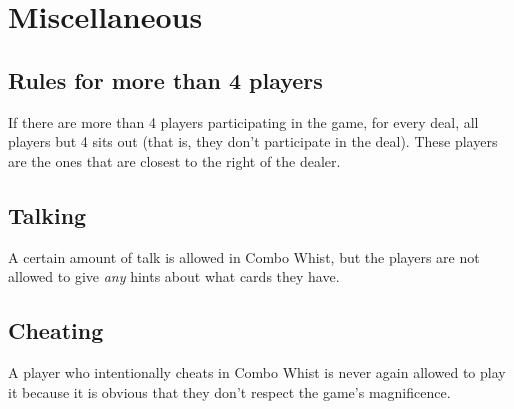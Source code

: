 \documentclass[a4paper]{article}
\begin{document}
	\section{Miscellaneous}
		\subsection{Rules for more than 4 players}
			If there are more than 4 players participating in the game, for every deal, all players but 4 sits out (that is, they don't participate in the deal). These players are the ones that are closest to the right of the dealer.
		
		\subsection{Talking}
			A certain amount of talk is allowed in Combo Whist, but the players are not allowed to give \emph{any} hints about what cards they have.
		
		\subsection{Cheating}
			A player who intentionally cheats in Combo Whist is never again allowed to play it because it is obvious that they don't respect the game's magnificence.

	\pagebreak
	
	
\end{document}
